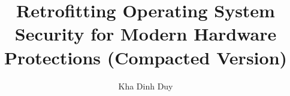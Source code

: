 \documentclass[a4paper,11pt]{SKKU-PhD-Thesis-compact}
\let\setyear\year
\let\year\TeXyear
\begin{document}



\author{Kha Dinh Duy}
\title{Retrofitting Operating System Security for Modern Hardware Protections (Compacted Version)}

\setyear{2025}

\newpage
\makecover



%

 \label{chap:Acknowledgement}
% 

\newpage

\setcounter{tocdepth}{2}


\newpage
{} \label{listoftab}

\newpage
{} \label{listoffig}


%

\end{document}
